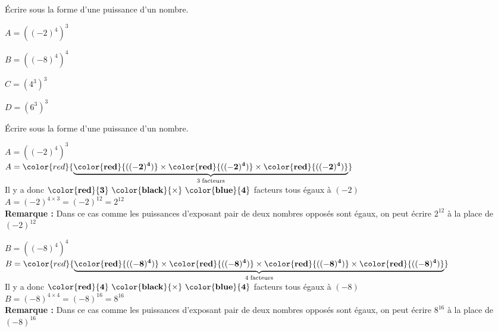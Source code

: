 \begin{exercice*}    
    Écrire sous la forme d'une puissance d'un nombre.
    \begin{multicols}{2}
        \begin{spacing}{2}
            $A=\left((-2)^4\right)^{3}$
            
            $B=\left((-8)^4\right)^{4}$

            \columnbreak            
            $C=\left(4^3\right)^{3}$

            $D=\left(6^3\right)^{3}$
        \end{spacing}
    \end{multicols}
\end{exercice*}
\begin{corrige}
    Écrire sous la forme d'une puissance d'un nombre.
    \begin{itemize}
        \def\item{} %
        \item  $A=\left((-2)^4\right)^{3}$\\
        $A=\color{red}{\underbrace{\mathbf{\color{red}{((-2)^4)}} \times \mathbf{\color{red}{((-2)^4)}}\times \mathbf{\color{red}{((-2)^4)}}}_{3\thickspace\text{facteurs}}}$\\            
        Il y a donc $\mathbf{\color{red}{3}~\color{black}{\times}~\color{blue}{4}}$ facteurs tous égaux à $(-2)$\\
        $A=(-2)^{4\times3} = (-2)^{12}=  2^{12}$\\
        \textbf{Remarque : } Dans ce cas comme les puissances d'exposant pair de deux nombres opposés sont égaux, on peut écrire $ 2^{12}$ à la place de $(-2)^{12}$

        \bigskip    
        \item $B=\left((-8)^4\right)^{4}$\\
        $B=\color{red}{\underbrace{\mathbf{\color{red}{((-8)^4)}} \times \mathbf{\color{red}{((-8)^4)}}\times \mathbf{\color{red}{((-8)^4)}}\times \mathbf{\color{red}{((-8)^4)}}}_{4\thickspace\text{facteurs}}}$\\            
        Il y a donc $\mathbf{\color{red}{4}~\color{black}{\times}~\color{blue}{4}}$ facteurs tous égaux à $(-8)$\\
        $B=(-8)^{4\times4} = (-8)^{16}=  8^{16}$\\
        \textbf{Remarque : } Dans ce cas comme les puissances d'exposant pair de deux nombres opposés sont égaux, on peut écrire $ 8^{16}$ à la place de $(-8)^{16}$


\end{itemize}
\end{corrige}
